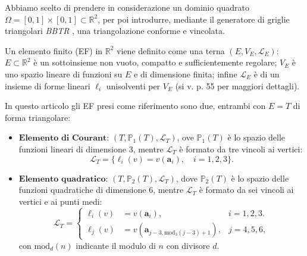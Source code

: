 \documentclass{article}
\begin{document}
            Abbiamo scelto di prendere in considerazione un dominio quadrato $\Omega=[0,1]\times[0,1] \subset\mathbb R^2$, per poi introdurre, mediante il generatore di griglie triangolari \textit{BBTR} \cite{barbera2008matematica}, una triangolazione conforme e vincolata. 
        
            Un elemento finito (EF) in $\mathbb{R}^2$ viene definito come una terna $(E,V_E,\mathcal L_E)$: $E\subset\mathbb R^2$ è un sottoinsieme non vuoto, compatto e sufficientemente regolare; $V_E$ è uno spazio lineare di funzioni su $E$ e di dimensione finita; infine $\mathcal L_E$ è di un insieme di forme lineari $\ell_i$ unisolventi per $V_E$ (si v. \cite{dispenseMEDèPA} p. 55 per maggiori dettagli). %
            
            In questo articolo gli EF presi come riferimento sono due, entrambi con $E=T$ di forma triangolare:
        
            \begin{itemize}[label=$\diamond$, %
                            itemsep=0pt,      %
                            leftmargin=10pt]  %
            
                \item $\textbf{Elemento di Courant}$: $(T,\mathbb P_1(T),\mathcal L_T)$, ove $\mathbb P_1(T)$ è lo spazio delle funzioni lineari di dimensione $3$, mentre $\mathcal L_T$ è formato da tre vincoli ai vertici:\vspace{-2.5pt}
                \begin{equation*}
                    \mathcal L_T=\{\ell_i(v)=v(\mathbf a_i),\quad i=1,2,3\}.
                \end{equation*}
                \item $\textbf{Elemento quadratico}$: $(T,\mathbb P_2(T),\mathcal L_T)$, dove $\mathbb{P}_2(T)$ è lo spazio delle funzioni quadratiche di dimensione $6$, mentre $\mathcal L_T$ è formato da sei vincoli ai vertici e ai punti medi:
                \begin{equation*}
                    \mathcal L_T=
                    \left\{
                    \begin{aligned}
                        \ell_i(v)&=v(\mathbf a_i),&i=1,2,3.\\
                        \ell_j(v)&=v(\mathbf a_{j-3,\text{mod}_3(j-3)+1}), &j=4,5,6,
                    \end{aligned}
                    \right.
                \end{equation*}
                con $\text{mod}_d(n)$ indicante il modulo di $n$ con divisore $d$.
            \end{itemize}
        
\end{document}
